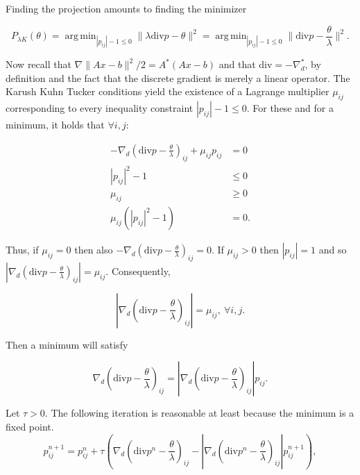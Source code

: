 \documentclass[paper=a4, fontsize=11pt]{scrartcl} %
\DeclareMathOperator*{\argmin}{arg\,min}
\numberwithin{equation}{section} %
\numberwithin{figure}{section} %
\numberwithin{table}{section} %
\newcommand{\param}{\theta}
\newcommand{\grad}{\nabla_{d} }
\newcommand{\divg}{\text{div}}
\begin{document}
Finding the projection amounts to finding the minimizer

\begin{equation*}
  P_{\lambda K}(\param) = \argmin_{|p_{ij}| - 1 \leq 0} \| \lambda \divg
  p - \param \|^2 = \argmin_{|p_{ij}| - 1 \leq 0} \| \divg p -
  \frac{\param}{\lambda} \|^2.
\end{equation*}

Now recall that $\nabla \|Ax - b \|^2/2 = A^*(Ax-b)$ and that $\divg =
-\grad^{*}$, by definition and the fact that the discrete gradient is
merely a linear operator. The Karush Kuhn Tucker conditions yield the
existence of a Lagrange multiplier $\mu_{ij}$ corresponding to every
inequality constraint $|p_{ij}| - 1 \leq 0$. For these and for a
minimum, it holds that $\forall i,j$:

\begin{align*}
  -\grad \left ( \divg p - \frac{\param}{\lambda} \right )_{ij} +  \mu_{ij} p_{ij} &= 0 \\
  |p_{ij}|^2 - 1 & \leq 0 \\ 
  \mu_{ij} &\geq 0 \\
  \mu_{ij}( |p_{ij}|^2 - 1 ) &= 0.
\end{align*}

Thus, if $\mu_{ij} = 0$ then also $-\grad(  \divg p -\frac{\param}{\lambda} )_{ij} = 0$.
If $\mu_{ij} > 0$ then $|p_{ij}| = 1$ and so $|\grad( \divg p - \frac{\param}{\lambda} )_{ij}| = \mu_{ij}$.
Consequently,

\begin{equation*}
 \left |\grad \left (\divg p - \frac{\param}{\lambda} \right )_{ij} \right | =  \mu_{ij}, \ \forall i,j.
\end{equation*}

Then a minimum will satisfy

\begin{equation*}
  \grad \left ( \divg p - \frac{\param}{\lambda} \right )_{ij} = \left
  |\grad \left ( \divg p - \frac{\param}{\lambda} \right )_{ij} \right
  | p_{ij}.
\end{equation*}

Let $\tau > 0$. The following iteration is reasonable at least because
the minimum is a fixed point.
\begin{equation}
  p_{ij}^{n+1} = p_{ij}^{n} + \tau \left ( \grad \left (\divg p^{n} -
    \frac{\param}{\lambda} \right )_{ij} - \left | \grad \left (\divg p^{n} -
    \frac{\param}{\lambda} \right )_{ij} \right | p_{ij}^{n+1} \right ),
\end{equation}
\end{document}
